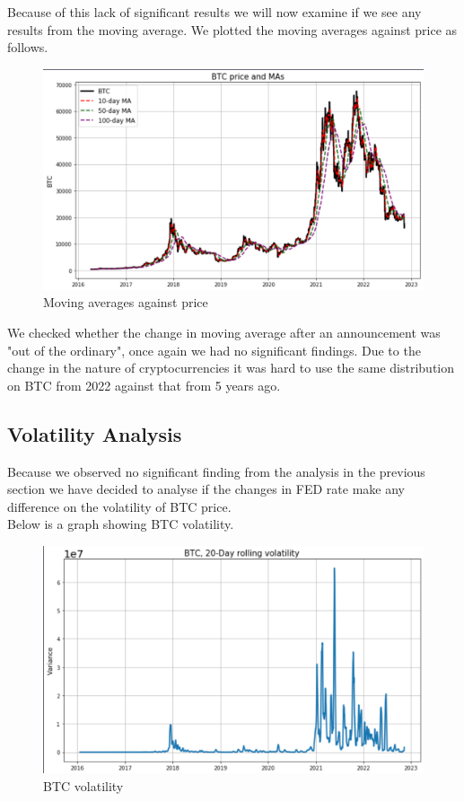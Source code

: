 \documentclass[12pt]{article}
\begin{document}
Because of this lack of significant results we will now examine if we see any results from the moving average. We plotted the moving averages against price as follows.
\begin{figure}[H]
   \includegraphics[scale=0.7]{research_project/text/paper/2.png}
   \centering
   \caption{Moving averages against price}
   \label{fig:FED Rate evolution 2016 - 2022}
\end{figure}
We checked whether the change in moving average after an announcement was "out of the ordinary", once again we had no significant findings. Due to the change in the nature of cryptocurrencies it was hard to use the same distribution on BTC from 2022 against that from 5 years ago.
\subsection{Volatility Analysis}
Because we observed no significant finding from the analysis in the previous section we have decided to analyse if the changes in FED rate make any difference on the volatility of BTC price.\\
Below is a graph showing BTC volatility.
\begin{figure}[H]
   \includegraphics[scale=0.7]{research_project/text/paper/6.png}
   \centering
   \caption{BTC volatility}
   \label{fig:FED Rate evolution 2016 - 2022}
\end{figure}
\end{document}
